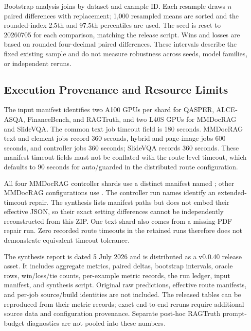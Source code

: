 Bootstrap analysis joins by dataset and example ID. Each resample draws $n$ paired differences with replacement; 1,000 resampled means are sorted and the rounded-index 2.5th and 97.5th percentiles are used. The seed is reset to 20260705 for each comparison, matching the release script. Wins and losses are based on rounded four-decimal paired differences. These intervals describe the fixed existing sample and do not measure robustness across seeds, model families, or independent reruns.

\subsection{Execution Provenance and Resource Limits}
The input manifest identifies two A100 GPUs per shard for QASPER, ALCE-ASQA, FinanceBench, and RAGTruth, and two L40S GPUs for MMDocRAG and SlideVQA. The common text job timeout field is 180 seconds. MMDocRAG text and element jobs record 360 seconds, hybrid and page-image jobs 600 seconds, and controller jobs 360 seconds; SlideVQA records 360 seconds. These manifest timeout fields must not be conflated with the route-level timeout, which defaults to 90 seconds for auto/guarded in the distributed route configuration.

All four MMDocRAG controller shards use a distinct manifest named
;
other MMDocRAG configurations use
.
The controller run names identify an extended-timeout repair. The synthesis lists manifest paths but does not embed their effective JSON, so their exact setting differences cannot be independently reconstructed from this ZIP. One text shard also comes from a missing-PDF repair run. Zero recorded route timeouts in the retained runs therefore does not demonstrate equivalent timeout tolerance.

The synthesis report is dated 5 July 2026 and is distributed as a v0.0.40 release asset. It includes aggregate metrics, paired deltas, bootstrap intervals, oracle rows, win/loss/tie counts, per-example metric records, the run ledger, input manifest, and synthesis script. Original raw predictions, effective route manifests, and per-job source/build identities are not included. The released tables can be reproduced from their metric records; exact end-to-end reruns require additional source data and configuration provenance. Separate post-hoc RAGTruth prompt-budget diagnostics are not pooled into these numbers.


